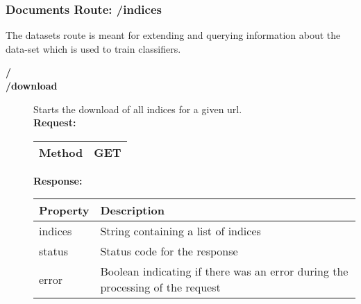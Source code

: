 \subsubsection{Documents Route: /indices}
The datasets route is meant for extending and querying information about the data-set which is used to train classifiers. 

\begin{description}


\item [{\large \textbf{/}}]
\item [{\large \textbf{/download}}]
Starts the download of all indices for a given url.\\


\textbf{Request:}
\newline
\newline
\begin{tabular}{ | l | l |}
\hline
Method & GET\\ \hline
\end{tabular}
\newline
\newline
\textbf{Response:}
\newline
\newline
\resizebox{\textwidth}{!} {
\begin{tabular}{ | l | l |}
\hline
\textbf{Property} & \textbf{Description}\\ \hline
indices & String containing a list of indices\\ \hline
status & Status code for the response\\ \hline
error & Boolean indicating if there was an error during the processing of the request\\ \hline
\end{tabular}}

\end{description}